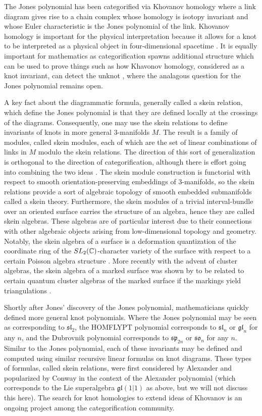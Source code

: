 The Jones polynomial has been categorified via Khovanov homology \cite{Kho00} where a link diagram gives rise to a chain complex whose homology is isotopy invariant and whose Euler characteristic is the Jones polynomial of the link. Khovanov homology is important for the physical interpretation because it allows for a knot to be interpreted as a physical object in four-dimensional spacetime \cite{Wit12}. It is equally important for mathematics as categorification spawns additional structure which can be used to prove things such as how Khavonov homology, considered as a knot invariant, can detect the unknot \cite{KM11}, where the analagous question for the Jones polynomial remains open.

A key fact about the diagrammatic formula, generally called a skein relation, which define the Jones polynomial is that they are defined locally at the crossings of the diagrams. Consequently, one may use the skein relations to define invariants of knots in more general $3$-manifolds $M$. The result is a family of modules, called skein modules, each of which are the set of linear combinations of links in $M$ modulo the skein relations. The direction of this sort of generalization is orthogonal to the direction of categorification, although there is effort going into combining the two ideas \cite{APS04}. The skein module construction is functorial with respect to smooth orientation-preserving embeddings of $3$-manifolds, so the skein relations provide a sort of algebraic topology of smooth embedded submanifolds called a skein theory. Furthermore, the skein modules of a trivial interval-bundle over an oriented surface carries the structure of an algebra, hence they are called skein algebras. These algebras are of particular interest due to their connections with other algebraic objects arising from low-dimensional topology and geometry. Notably, the skein algebra of a surface is a deformation quantization of the coordinate ring of the $SL_2(\mathbb{C})$-character variety of the surface with respect to a certain Poisson algebra structure \cite{BFK99}. More recently with the advent of cluster algebras, the skein algebra of a marked surface was shown by to be related to certain quantum cluster algebras of the marked surface if the markings yield triangulations \cite{Mul16}.

Shortly after Jones' discovery of the Jones polynomial, mathematicians quickly defined more general knot polynomials. Where the Jones polynomial may be seen as corresponding to $\mathfrak{sl}_2$, the HOMFLYPT polynomial \cite{FHLMOY85} \cite{PT88} corresponds to $\mathfrak{sl}_n$ or $\mathfrak{gl}_n$ for any $n$, and the Dubrovnik polynomial \cite{Kau90} corresponds to $\mathfrak{sp}_{2n}$ or $\mathfrak{so}_n$ for any $n$. Similar to the Jones polynomial, each of these invariants may be defined and computed using similar recursive linear formulas on knot diagrams. These types of formulas, called skein relations, were first considered by Alexander \cite{Ale28} and popularized by Conway \cite{Con70} in the context of the Alexander polynomial (which corresponds to the Lie superalgebra $\mathfrak{gl}(1|1)$ as above, but we will not discuss this here). The search for knot homologies to extend ideas of Khovanov is an ongoing project among the categorification community. 

